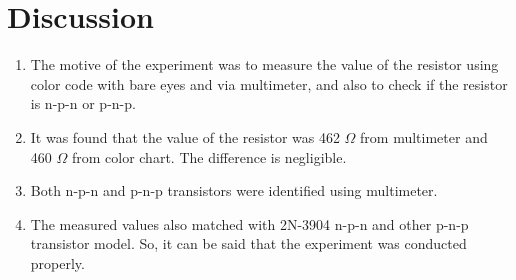 \documentclass[12pt]{article}
\begin{document}
\section{Discussion}
\begin{enumerate}
    \item The motive of the experiment was to measure the value of the resistor using color code with bare eyes and via multimeter, and also to check if the resistor is n-p-n or p-n-p.
    \item It was found that the value of the resistor was 462 $\Omega$ from multimeter and 460 $\Omega$ from color chart. The difference is negligible.
    \item Both n-p-n and p-n-p transistors were identified using multimeter.
    \item The measured values also matched with 2N-3904 n-p-n and other p-n-p transistor model. So, it can be said that the experiment was conducted properly.
\end{enumerate}
\end{document}
